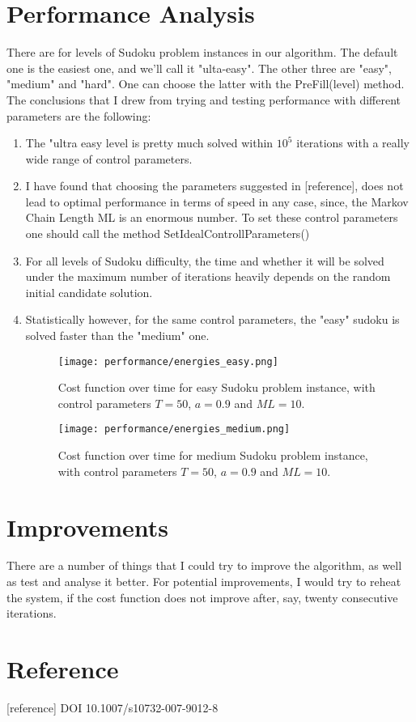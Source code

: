 \documentclass[11pt]{report}
\begin{document}
\section*{Performance Analysis}

There are for levels of Sudoku problem instances in our algorithm. The default one is the easiest one, and we'll call it "ulta-easy". The other three are "easy", "medium" and "hard". One can choose the latter with the PreFill(level) method. The conclusions that I drew from trying and testing performance with different parameters are the following:
\begin{enumerate}
	\item The "ultra easy level is pretty much solved within $10^5$ iterations with a really wide range of control parameters.
	\item I have found that choosing the parameters suggested in [reference], does not lead to optimal performance in terms of speed in any case, since, the Markov Chain Length ML is an enormous number. To set these control parameters one should call the method SetIdealControllParameters()
	\item For all levels of Sudoku difficulty, the time and whether it will be solved under the maximum number of iterations heavily depends on the random initial candidate solution.
	\item Statistically however, for the same control parameters, the "easy" sudoku is solved faster than the "medium" one.
	\begin{figure}[ht!]
		\centering
		\texttt{[image: performance/energies\_easy.png]}
		\caption{Cost function over time for easy Sudoku problem instance, with control parameters $T=50$, $a=0.9$ and $ML = 10$.}
	\end{figure}
	
		\begin{figure}[ht!]
		\centering
		\texttt{[image: performance/energies\_medium.png]}
		\caption{Cost function over time for medium Sudoku problem instance, with control parameters $T=50$, $a=0.9$ and $ML = 10$.}
	\end{figure}
\end{enumerate}


\section*{Improvements}

There are a number of things that I could try to improve the algorithm, as well as test and analyse it better. For potential improvements, I would try to reheat the system, if the cost function does not improve after, say, twenty consecutive iterations. 

 
\section*{Reference}

[reference] DOI 10.1007/s10732-007-9012-8
\end{document}
